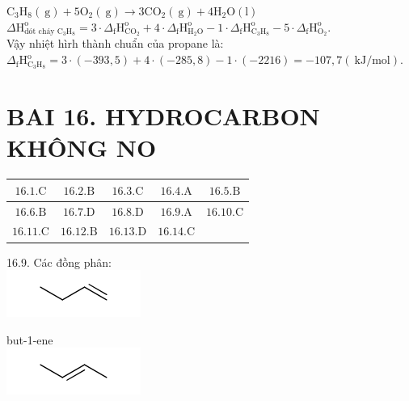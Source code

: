 \documentclass[10pt]{article}
\begin{document}
$\mathrm{C}_{3} \mathrm{H}_{8}(\mathrm{~g})+5 \mathrm{O}_{2}(\mathrm{~g}) \longrightarrow 3 \mathrm{CO}_{2}(\mathrm{~g})+4 \mathrm{H}_{2} \mathrm{O}(\mathrm{l})$\\
$\Delta \mathrm{H}_{\text {dót cháy } \mathrm{C}_{3} \mathrm{H}_{8}}^{\mathrm{o}}=3 \cdot \Delta_{\mathrm{f}} \mathrm{H}_{\mathrm{CO}_{2}}^{\mathrm{o}}+4 \cdot \Delta_{\mathrm{f}} \mathrm{H}_{\mathrm{H}_{2} \mathrm{O}}^{\mathrm{o}}-1 \cdot \Delta_{\mathrm{f}} \mathrm{H}_{\mathrm{C}_{3} \mathrm{H}_{8}}^{\mathrm{o}}-5 \cdot \Delta_{\mathrm{f}} \mathrm{H}_{\mathrm{O}_{2}}^{\mathrm{o}}$.\\
Vậy nhiệt hìrh thành chuẩn của propane là:\\
$\Delta_{\mathrm{f}} \mathrm{H}_{\mathrm{C}_{3} \mathrm{H}_{8}}^{\mathrm{o}}=3 \cdot(-393,5)+4 \cdot(-285,8)-1 \cdot(-2216)=-107,7(\mathrm{~kJ} / \mathrm{mol})$.

\section*{BAI 16. HYDROCARBON KHÔNG NO}
\begin{center}
\begin{tabular}{|c|c|c|c|c|}
\hline
$16.1 . \mathrm{C}$ & $16.2 . \mathrm{B}$ & $16.3 . \mathrm{C}$ & $16.4 . \mathrm{A}$ & $16.5 . \mathrm{B}$ \\
\hline
$16.6 . \mathrm{B}$ & $16.7 . \mathrm{D}$ & $16.8 . \mathrm{D}$ & $16.9 . \mathrm{A}$ & $16.10 . \mathrm{C}$ \\
\hline
$16.11 . \mathrm{C}$ & $16.12 . \mathrm{B}$ & $16.13 . \mathrm{D}$ & $16.14 . \mathrm{C}$ &  \\
\hline
\end{tabular}
\end{center}

16.9. Các đồng phân:\\
\includegraphics{smile-d1989dba5b137c6f5b8579b645fa485fe0c799f6}

but-1-ene\\
\includegraphics{smile-7f2337270553a145e384a8290ceaa72d5827c4f6}
\end{document}

